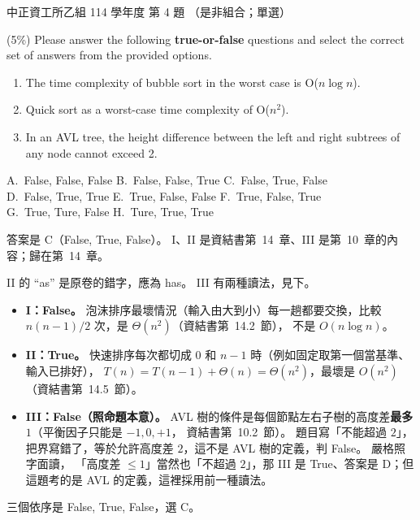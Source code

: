 \begin{pastexam}[label={px:ccu-114-csb-04}]{中正資工所乙組 114 學年度 第 4 題}
（是非組合；單選）

(5\%) Please answer the following \textbf{true-or-false} questions and select the correct set of answers from the provided options.
\begin{enumerate}[label=\Roman*.]
\item The time complexity of bubble sort in the worst case is O($n\log n$).
\item Quick sort as a worst-case time complexity of O($n^2$).
\item In an AVL tree, the height difference between the left and right subtrees of any node cannot exceed 2.
\end{enumerate}

A.~False, False, False \qquad B.~False, False, True \qquad C.~False, True, False\\
D.~False, True, True \qquad E.~True, False, False \qquad F.~True, False, True\\
G.~True, Ture, False \qquad H.~Ture, True, True
\end{pastexam}

\begin{pastsoln}
答案是 C（False, True, False）。 I、II 是資結書第~14~章、III 是第~10~章的內容；歸在第~14~章。

II 的 ``as'' 是原卷的錯字，應為 has。 III 有兩種讀法，見下。
\begin{itemize}
\item \textbf{I：False。} 泡沫排序最壞情況（輸入由大到小）每一趟都要交換，比較 $n(n-1)/2$ 次，是 $\Theta(n^2)$（資結書第~14.2~節），
不是 $O(n \log n)$。
\item \textbf{II：True。} 快速排序每次都切成 $0$ 和 $n - 1$ 時（例如固定取第一個當基準、輸入已排好），
$T(n) = T(n-1) + \Theta(n) = \Theta(n^2)$，最壞是 $O(n^2)$（資結書第~14.5~節）。
\item \textbf{III：False（照命題本意）。} AVL 樹的條件是每個節點左右子樹的高度差\textbf{最多 $1$}（平衡因子只能是 $-1, 0, +1$，
資結書第~10.2~節）。 題目寫「不能超過 $2$」，把界寫錯了，等於允許高度差 $2$，這不是 AVL 樹的定義，判 False。 嚴格照字面讀，
「高度差 $\le 1$」當然也「不超過 $2$」，那 III 是 True、答案是 D；但這題考的是 AVL 的定義，這裡採用前一種讀法。
\end{itemize}
三個依序是 False, True, False，選 C。
\end{pastsoln}
